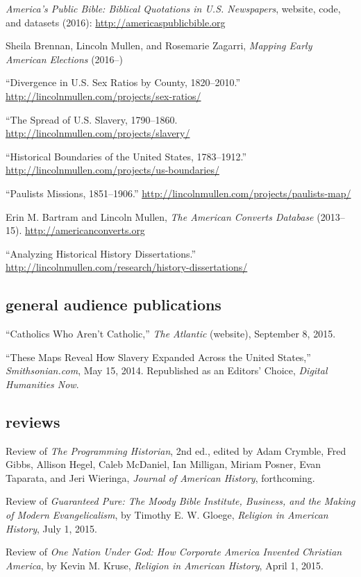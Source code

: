 \documentclass[11pt]{article}
\begin{document}
\emph{America's Public Bible: Biblical Quotations in U.S. Newspapers}, 
website, code, and datasets (2016): \url{http://americaspublicbible.org}

Sheila Brennan, Lincoln Mullen, and Rosemarie Zagarri, 
\emph{Mapping Early American Elections} (2016--)

``Divergence in U.S. Sex Ratios by County, 1820--2010.'' \url{http://lincolnmullen.com/projects/sex-ratios/}

``The Spread of U.S.  Slavery, 1790--1860. 
\url{http://lincolnmullen.com/projects/slavery/}

``Historical Boundaries of the United States, 1783--1912.'' \url{http://lincolnmullen.com/projects/us-boundaries/}

``Paulists Missions, 1851--1906.'' \url{http://lincolnmullen.com/projects/paulists-map/}

Erin M. Bartram and Lincoln Mullen, \emph{The American Converts Database} 
(2013--15). \url{http://americanconverts.org}

``Analyzing Historical History Dissertations.'' \url{http://lincolnmullen.com/research/history-dissertations/}

\subsection{general audience publications}\label{selected-online-essays}

``Catholics Who Aren't Catholic,'' \emph{The Atlantic} (website), September 8, 
2015.

``These Maps Reveal How Slavery Expanded Across the United States,''
\emph{Smithsonian.com}, May 15, 2014. Republished as an Editors' Choice,
\emph{Digital Humanities Now}.

\subsection{reviews}\label{book-reviews}

Review of \emph{The Programming Historian}, 2nd ed., edited by
Adam Crymble, Fred Gibbs, Allison Hegel, Caleb McDaniel, Ian Milligan, Miriam 
Posner, Evan Taparata, and Jeri Wieringa, \emph{Journal of American History}, 
forthcoming.

Review of \emph{Guaranteed Pure: The Moody Bible Institute, Business, and the 
  Making of Modern Evangelicalism}, by Timothy E. W. Gloege, \emph{Religion in 
  American History}, July 1, 2015.

Review of \emph{One Nation Under God: How Corporate America Invented Christian 
  America}, by Kevin M. Kruse, \emph{Religion in American History}, April 1, 
2015.
\end{document}
